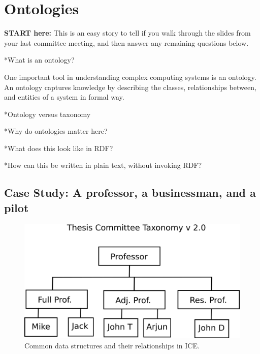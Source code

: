 \chapter{Ontologies} \label{ch:ontologies}

\textbf{START here:} This is an easy story to tell if you walk through the
slides from your last committee meeting, and then answer any remaining
questions below.

*What is an ontology?

One important tool in understanding complex computing systems is an ontology.
An ontology captures knowledge by describing the classes, relationships
between, and entities of a system in formal way. 

*Ontology versus taxonomy

*Why do ontologies matter here?

*What does this look like in RDF?

*How can this be written in plain text, without invoking RDF?

\section{Case Study: A professor, a businessman, and a pilot}


\begin{figure}[htbp]
\centering
\includegraphics[width=\textwidth]{figures/tc-tax-v2.png}
\caption{Common data structures and their relationships in ICE.}
\label{data-arch}
\end{figure}


